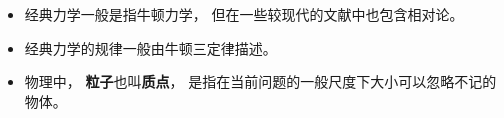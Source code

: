 
\begin{issues}
\issueDraft
\end{issues}

\begin{itemize}
\item 经典力学一般是指牛顿力学， 但在一些较现代的文献中也包含相对论。
\item 经典力学的规律一般由牛顿三定律描述。
\item 物理中， \textbf{粒子}也叫\textbf{质点}， 是指在当前问题的一般尺度下大小可以忽略不记的物体。
\end{itemize}
